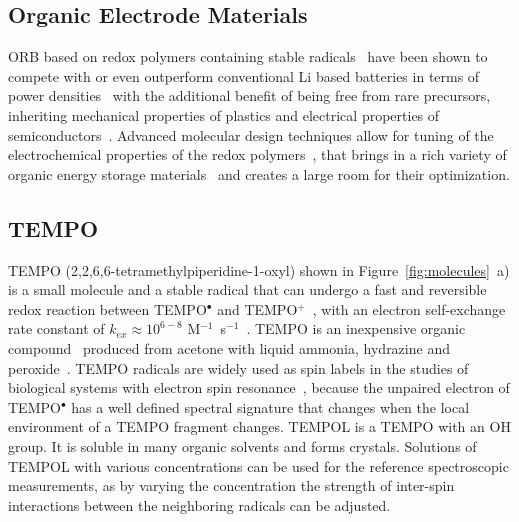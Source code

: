\subsection{Organic Electrode Materials}
\label{sec:ORB_materials}
ORB based on redox polymers containing stable radicals~\cite{nakahara2002_cpl} have been shown to compete with or even outperform  conventional Li based batteries in terms of power densities~\cite{IWASA2007} with the additional benefit of being free from rare precursors, inheriting mechanical properties of plastics and electrical properties of semiconductors~\cite{friebe2017_topcurrchem,Casado2021,Goujon2021}. Advanced molecular design techniques allow for tuning of the electrochemical properties of the redox polymers~\cite{Janoschka2017}, that brings in a rich variety of organic energy storage materials~\cite{Xie2021,Vereshchagin2022,Janoschka2017a} and creates a large room for their optimization. 

\par
\subsection{TEMPO}
TEMPO (2,2,6,6-tetramethylpiperidine-1-oxyl) shown in Figure~\ref{fig:molecules}~a) is a small molecule and a stable radical that can undergo a fast and reversible redox reaction between TEMPO$^\bullet$ and TEMPO$^+$~\cite{Wang2019}, with an electron self-exchange rate constant of $k_{ex}\approx10^{6-8}$ M$^{-1}$~s$^{-1}$~\cite{Chatgilialoglu2012}. TEMPO is an inexpensive organic compound~\cite{Vereshchagin2022} produced from acetone with liquid ammonia, hydrazine and peroxide~\cite{Casado_2021_book}. TEMPO radicals are widely used as spin labels in the studies of biological systems with electron spin resonance~\cite{Bordignon2017}, because the unpaired electron of TEMPO$^\bullet$ has a well defined spectral signature that changes when the local environment of a TEMPO fragment changes. TEMPOL is a TEMPO with an OH group. It is soluble in many organic solvents and forms crystals. Solutions of TEMPOL with various concentrations can be used for the reference spectroscopic measurements, as by varying the concentration the strength of inter-spin interactions between the neighboring radicals can be adjusted.

